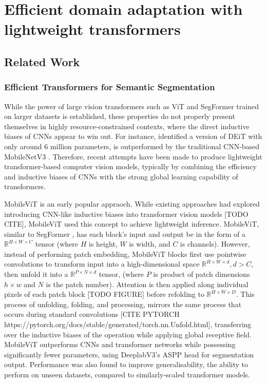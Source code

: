 \documentclass[a4paper,12pt]{report}
\begin{document}
\chapter{Efficient domain adaptation with lightweight transformers}

\section{Related Work}

\subsection{Efficient Transformers for Semantic Segmentation}

While the power of large vision transformers such as ViT and SegFormer trained on larger datasets is established, these properties do not properly present themselves in highly resource-constrained contexts, where the direct inductive biases of CNNs appear to win out. For instance, \cite{mehta_mobilevit_2022} identified a version of DEiT \cite{touvron_training_2021} with only around 6 million parameters, is outperformed by the traditional CNN-based MobileNetV3 \cite{howard_searching_2019}. Therefore, recent attempts have been made to produce lightweight transformer-based computer vision models, typically by combining the efficiency and inductive biases of CNNs with the strong global learning capability of transformers.

MobileViT \cite{mehta_mobilevit_2022} is an early popular appraoch. While existing approaches had explored introducing CNN-like inductive biases into transformer vision models [TODO CITE], MobileViT \cite{mehta_mobilevit_2022} used this concept to achieve lightweight inference. MobileViT, similar to SegFormer \cite{xie_segformer_2021}, has each block's input and output be in the form of a $\mathbb{R}^{H \times W \times C}$ tensor (where $H$ is height, $W$ is width, and $C$ is channels). However, instead of performing patch embedding, MobileViT blocks first use pointwise convolutions to transform input into a high-dimensional space $\mathbb{R}^{H \times W \times d}, d > C$, then unfold it into a $\mathbb{R}^{P \times N \times d}$ tensor, (where $P$ is product of patch dimensions $h \times w$ and $N$ is the patch number). Attention is then applied along individual pixels of each patch block [TODO FIGURE] before refolding to $\mathbb{R}^{H \times W \times D}$. This process of unfolding, folding, and processing, mirrors the same process that occurs during standard convolutions [CITE PYTORCH https://pytorch.org/docs/stable/generated/torch.nn.Unfold.html], transferring over the inductive biases of the operation while applying global receptive field. MobileViT outperforms CNNs and transformer networks while possessing significantly fewer parameters, using DeeplabV3's ASPP head \cite{chen_rethinking_2017} for segmentation output. Performance was also found to improve generalisability, the ability to perform on unseen datasets, compared to similarly-scaled transformer models.
\end{document}
